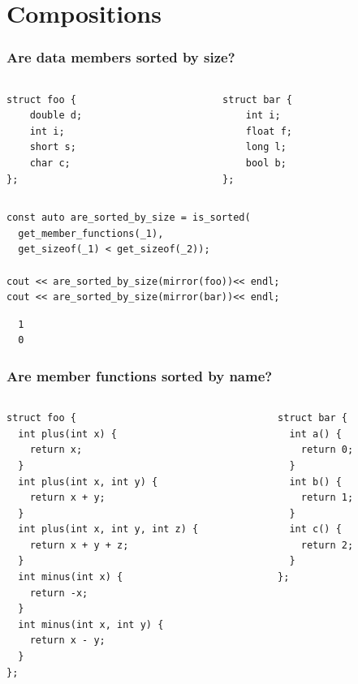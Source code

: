 \documentclass[compress,table,xcolor=table]{beamer}
\begin{document}
\section{Compositions}
\begin{frame}[fragile]
  \frametitle{Are data members sorted by size?}
  \begin{columns}
    \begin{column}{.45\textwidth}
      \begin{lstlisting}[language=c++2x,basicstyle=\small\ttfamily]
struct foo {
    double d;
    int i;
    short s;
    char c;
};
      \end{lstlisting}
    \end{column}
    \begin{column}{.45\textwidth}
      \begin{lstlisting}[language=c++2x,basicstyle=\small\ttfamily]
struct bar {
    int i;
    float f;
    long l;
    bool b;
};
      \end{lstlisting}
    \end{column}
  \end{columns}
  \begin{lstlisting}[language=c++2x,basicstyle=\small\ttfamily]
const auto are_sorted_by_size = is_sorted(
  get_member_functions(_1),
  get_sizeof(_1) < get_sizeof(_2));

cout << are_sorted_by_size(mirror(foo))<< endl;
cout << are_sorted_by_size(mirror(bar))<< endl;
  \end{lstlisting}
  \begin{verbatim}
  1
  0
  \end{verbatim}
\end{frame}
\begin{frame}[fragile]
  \frametitle{Are member functions sorted by name?}
  \begin{columns}
    \begin{column}{.65\textwidth}
      \begin{lstlisting}[language=c++2x,basicstyle=\footnotesize\ttfamily]
struct foo {
  int plus(int x) {
    return x;
  }
  int plus(int x, int y) {
    return x + y;
  }
  int plus(int x, int y, int z) {
    return x + y + z;
  }
  int minus(int x) {
    return -x;
  }
  int minus(int x, int y) {
    return x - y;
  }
};
      \end{lstlisting}
    \end{column}
    \begin{column}{.35\textwidth}
      \begin{lstlisting}[language=c++2x,basicstyle=\small\ttfamily]
struct bar {
  int a() {
    return 0;
  }
  int b() {
    return 1;
  }
  int c() {
    return 2;
  }
};
      \end{lstlisting}
    \end{column}
  \end{columns}
\end{frame}
\end{document}
